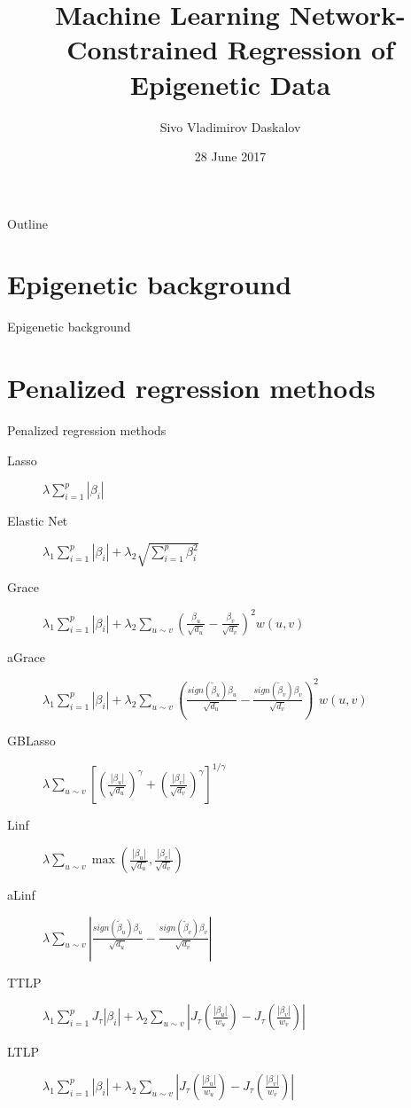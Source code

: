 \documentclass{beamer}
\title{Machine Learning Network-Constrained Regression of Epigenetic Data}
\author{Sivo Vladimirov Daskalov}
\institute{Corpus Christi College}
\date{28 June 2017}
\begin{document}
	
\begin{frame}
	\titlepage
\end{frame}

\begin{frame}{Outline}
  \tableofcontents
\end{frame}

\section{Epigenetic background}
\begin{frame}{Epigenetic background}
\end{frame}

\section{Penalized regression methods}
\begin{frame}{Penalized regression methods}
\small
\begin{description}
	\item[Lasso] $\lambda\sum_{i=1}^{p}\left|\beta_i\right|$
	\item[Elastic Net] $\lambda_1\sum_{i=1}^{p}\left|\beta_i\right| + \lambda_2\sqrt{\sum_{i=1}^{p}\beta_i^2}$
	\item[Grace] $\lambda_1\sum_{i=1}^{p}\left|\beta_i\right| + \lambda_2\sum_{u \sim v}\left(\frac{\beta_u}{\sqrt{d_u}}-\frac{\beta_v}{\sqrt{d_v}}\right)^2w(u,v)$
	\item[aGrace] $\lambda_1\sum_{i=1}^{p}\left|\beta_i\right| + \lambda_2\sum_{u \sim v}\left(\frac{sign(\tilde{\beta}_u)\beta_u}{\sqrt{d_u}}-\frac{sign(\tilde{\beta}_v)\beta_v}{\sqrt{d_v}}\right)^2w(u,v)$
	\item[GBLasso] $\lambda\sum_{u \sim v}
	\left[\left(\frac{|\beta_u|}{\sqrt{d_u}}\right)^\gamma+
	\left(\frac{|\beta_v|}{\sqrt{d_v}}\right)^\gamma\right]^{1/\gamma}$
	\item[Linf] $\lambda\sum_{u \sim v}\max\left(\frac{|\beta_u|}{\sqrt{d_u}},\frac{|\beta_v|}{\sqrt{d_v}}\right)$
	\item[aLinf] $\lambda\sum_{u \sim v}\left|\frac{sign(\tilde{\beta}_u)\beta_u}{\sqrt{d_u}}-\frac{sign(\tilde{\beta}_v)\beta_v}{\sqrt{d_v}}\right|$
	\item[TTLP] $\lambda_1 \sum_{i=1}^{p} J_\tau|\beta_i| + \lambda_2 \sum_{u \sim v} \left|J_\tau\left(\frac{|\beta_u|}{w_u}\right)-J_\tau\left(\frac{|\beta_v|}{w_v}\right)\right|$
	\item[LTLP] $\lambda_1 \sum_{i=1}^{p}\left|\beta_i\right| + \lambda_2 \sum_{u \sim v} \left|J_\tau\left(\frac{|\beta_u|}{w_u}\right)-J_\tau\left(\frac{|\beta_v|}{w_v}\right)\right|$
\end{description}
\normalsize
\end{frame}
\end{document}
